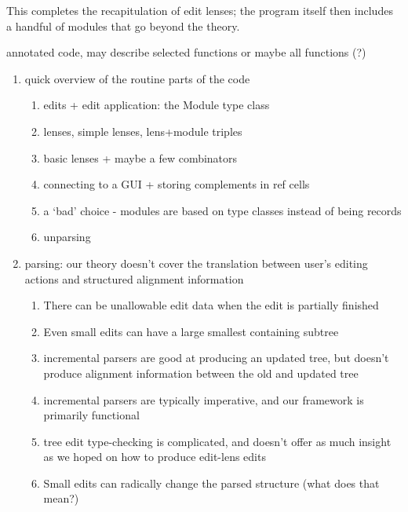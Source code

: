 This completes the recapitulation of edit lenses; the program itself then
includes a handful of modules that go beyond the theory.

annotated code, may describe selected functions or maybe all functions (?)
\begin{enumerate}
    \item quick overview of the routine parts of the code
        \begin{enumerate}
            \item edits + edit application: the Module type class
            \item lenses, simple lenses, lens+module triples
            \item basic lenses + maybe a few combinators
            \item connecting to a GUI + storing complements in ref cells
            \item a `bad' choice - modules are based on type classes instead of being records
            \item unparsing
        \end{enumerate}
    \item parsing: our theory doesn't cover the translation between user's editing actions and structured alignment information
        \begin{enumerate}
            \item There can be unallowable edit data when the edit is partially finished
            \item Even small edits can have a large smallest containing subtree
            \item incremental parsers are good at producing an updated tree, but doesn't produce alignment information between the old and updated tree
            \item incremental parsers are typically imperative, and our framework is primarily functional
            \item tree edit type-checking is complicated, and doesn't offer as much insight as we hoped on how to produce edit-lens edits
            \item Small edits can radically change the parsed structure (what does that mean?)
        \end{enumerate}
\end{enumerate}

